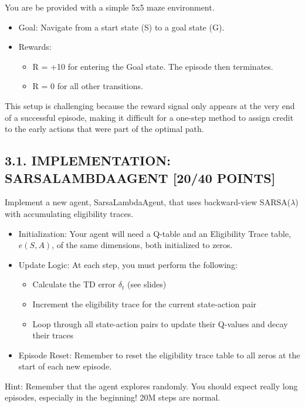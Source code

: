 \documentclass{article}
\begin{document}
You are be provided with a simple 5x5 maze environment.

\begin{itemize}
    \item Goal: Navigate from a start state (S) to a goal state (G).
    \item Rewards:
    \begin{itemize}
        \item R = +10 for entering the Goal state. The episode then terminates.
        \item R = 0 for all other transitions.
    \end{itemize}
\end{itemize}

This setup is challenging because the reward signal only appears at the very end of a successful episode, making it difficult for a one-step method to assign credit to the early actions that were part of the optimal path.

\subsection{3.1. IMPLEMENTATION: SARSALAMBDAAGENT [20/40 POINTS]}

Implement a new agent, SarsaLambdaAgent, that uses backward-view SARSA($\lambda$) with accumulating eligibility traces.

\begin{itemize}
    \item Initialization: Your agent will need a Q-table and an Eligibility Trace table, $e(S, A)$, of the same dimensions, both initialized to zeros.
    \item Update Logic: At each step, you must perform the following:
    \begin{itemize}
        \item Calculate the TD error $\delta_t$ (see slides)
        \item Increment the eligibility trace for the current state-action pair
        \item Loop through all state-action pairs to update their Q-values and decay their traces
    \end{itemize}
    \item Episode Reset: Remember to reset the eligibility trace table to all zeros at the start of each new episode.
\end{itemize}

Hint: Remember that the agent explores randomly. You should expect really long episodes, especially in the beginning! 20M steps are normal.
\end{document}
